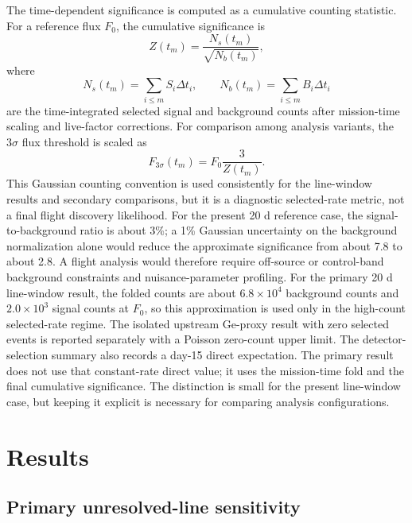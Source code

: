 \documentclass[preprint,12pt]{elsarticle}
\newcommand{\fzero}{F_{0}}
\newcommand{\fthree}{F_{3\sigma}}
\begin{document}
The time-dependent significance is computed as a cumulative counting statistic. For a reference flux $\fzero$, the cumulative significance is
\begin{equation}
  Z(t_m) = \frac{N_s(t_m)}{\sqrt{N_b(t_m)}},
\end{equation}
where
\begin{equation}
  N_s(t_m)=\sum_{i\leq m}S_i\Delta t_i,\qquad
  N_b(t_m)=\sum_{i\leq m}B_i\Delta t_i
\end{equation}
are the time-integrated selected signal and background counts after
mission-time scaling and live-factor corrections. For comparison among
analysis variants, the $3\sigma$ flux threshold is scaled as
\begin{equation}
  \fthree(t_m) = \fzero \frac{3}{Z(t_m)}.
\end{equation}
This Gaussian counting convention is used consistently for the line-window
results and secondary comparisons, but it is a diagnostic selected-rate metric,
not a final flight discovery likelihood. For the present 20 d reference case,
the signal-to-background ratio is about 3\%; a 1\% Gaussian uncertainty on the
background normalization alone would reduce the approximate significance from
about 7.8 to about 2.8. A flight analysis would therefore require off-source
or control-band background constraints and nuisance-parameter profiling.
For the primary 20 d line-window result, the folded counts are about
$6.8\times10^4$ background counts and $2.0\times10^3$ signal counts at
$\fzero$, so this approximation is used only in the high-count selected-rate
regime. The isolated upstream Ge-proxy result with zero selected events is
reported separately with a Poisson zero-count upper limit.
The detector-selection summary also records a day-15 direct expectation. The primary
result does not use that constant-rate direct value; it uses the
mission-time fold and the final cumulative significance. The distinction is
small for the present line-window case, but keeping it explicit is necessary
for comparing analysis configurations.

\section{Results}
\label{sec:results}

\subsection{Primary unresolved-line sensitivity}
\label{subsec:primary}
\end{document}
